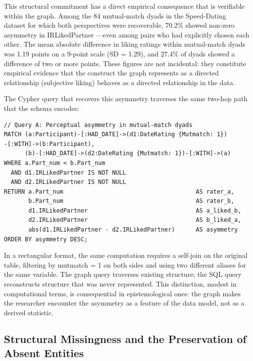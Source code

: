 \documentclass[sn-apa,pdflatex]{sn-jnl}
\theoremstyle{remark}
\theoremstyle{definition}
\begin{document}
This structural commitment has a direct empirical consequence that is
verifiable within the graph. Among the 84 mutual-match dyads in the
Speed-Dating dataset for which both perspectives were recoverable,
70.2\% showed non-zero asymmetry in IRLikedPartner ---even among pairs
who had explicitly chosen each other. The mean absolute difference in
liking ratings within mutual-match dyads was 1.19 points on a 9-point
scale (SD = 1.29), and 27.4\% of dyads showed a difference of two or
more points. These figures are not incidental: they constitute empirical
evidence that the construct the graph represents as a directed
relationship (subjective liking) behaves as a directed relationship in
the data.

The Cypher query that recovers this asymmetry traverses the same two-hop
path that the schema encodes:

\begin{verbatim}
// Query A: Perceptual asymmetry in mutual-match dyads
MATCH (a:Participant)-[:HAD_DATE]->(d1:DateRating {Mutmatch: 1})
-[:WITH]->(b:Participant),
      (b)-[:HAD_DATE]->(d2:DateRating {Mutmatch: 1})-[:WITH]->(a)
WHERE a.Part_num < b.Part_num
  AND d1.IRLikedPartner IS NOT NULL
  AND d2.IRLikedPartner IS NOT NULL
RETURN a.Part_num                                      AS rater_a,
       b.Part_num                                      AS rater_b,
       d1.IRLikedPartner                               AS a_liked_b,
       d2.IRLikedPartner                               AS b_liked_a,
       abs(d1.IRLikedPartner - d2.IRLikedPartner)      AS asymmetry
ORDER BY asymmetry DESC;
\end{verbatim}

In a rectangular format, the same computation requires a self-join on
the original table, filtering by mutmatch = 1 on both sides and using
two different aliases for the same variable. The graph query traverses
existing structure; the SQL query reconstructs structure that was never
represented. This distinction, modest in computational terms, is
consequential in epistemological ones: the graph makes the researcher
encounter the asymmetry as a feature of the data model, not as a derived
statistic.

\subsection{Structural Missingness and the Preservation of Absent
Entities}\label{structural-missingness-and-the-preservation-of-absent-entities}
\end{document}
